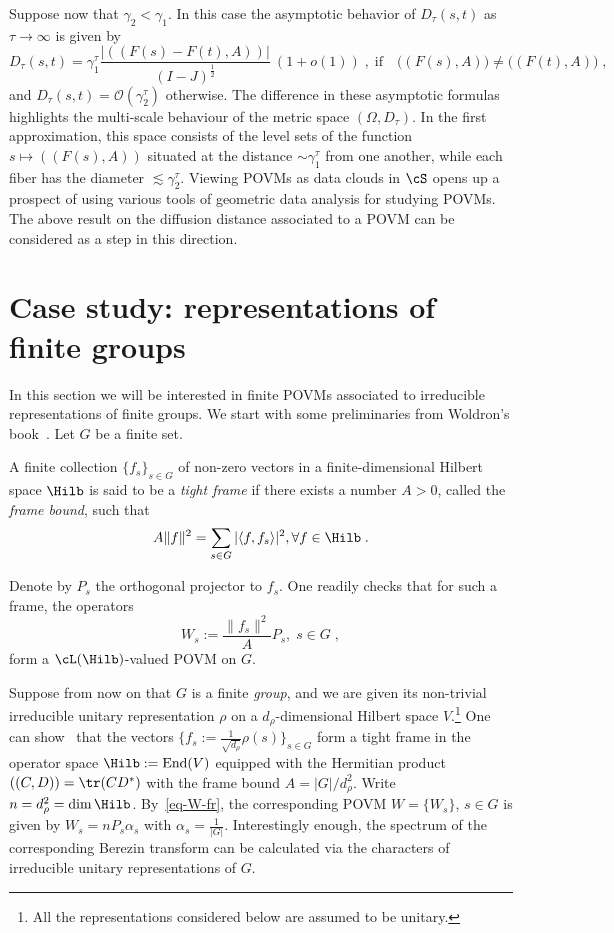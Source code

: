 Suppose now that $\gamma_2 < \gamma_1$. In this case the asymptotic behavior of $D_\tau(s,t)$ as $\tau \to \infty$ is given by
\begin{equation}
D_\tau(s,t)= \gamma_1^\tau\frac{|((F(s)-F(t),A))|}{(I-J)^{\frac{1}{2}}}\ (1+o(1))\;,\;\text{if}\quad \big((F(s),A))\neq ((F(t),A)\big)\;,
\end{equation}
and $D_\tau(s,t) = \mathcal{O}(\gamma_2^\tau)$ otherwise. The difference in these asymptotic formulas highlights the multi-scale behaviour of the metric space $(\Omega, D_\tau)$. In the first approximation, this space consists of the level sets of the function $s \mapsto ((F(s),A))$ situated at the distance $\sim \gamma_1^\tau$ from one another, while each fiber has the diameter $\lesssim \gamma_2^\tau$. Viewing POVMs as data clouds in $\cS$ opens up a prospect of using various tools of geometric data analysis for studying POVMs. The above result on the diffusion distance associated to a POVM can be considered as a step in this direction.

\section{Case study: representations of finite groups} \label{sec-groups}
In this section we will be interested in finite POVMs associated to irreducible representations of finite groups. We start with some preliminaries from Woldron's book~\cite{W}. Let $G$ be a finite set.

\begin{defi}\label{def-tight frame}
A finite collection $\{f_s\}_{s\in G}$ of non-zero vectors in a finite-dimensional Hilbert space $\Hilb$ is said to be a \emph{tight frame} if there exists a number $A > 0$, called the \emph{frame bound}, such that
\begin{equation}\label{Bessel}
A\| f \|^2 =\sum_{s\in G}|\langle f, f_s \rangle|^2, \forall f\in \Hilb\;.
\end{equation}
\end{defi}

Denote by $P_s$ the orthogonal projector to $f_s$. One readily checks that for such a frame, the operators
\begin{equation}\label{eq-W-fr}
W_s:= \frac{\|f_s\|^2}{A} P_s, \; s \in G\;,
\end{equation}
form a $\cL(\Hilb)$-valued POVM on $G$.

Suppose from now on that $G$ is a finite \emph{ group}, and we are given its non-trivial irreducible unitary representation $\rho$ on a $d_\rho$-dimensional Hilbert space $V$.\footnote{All the representations considered below are assumed to be unitary.} One can show~\cite{W} that the vectors $\{f_s:=\frac{1}{\sqrt{d_\rho}}\rho(s)\}_{s\in G}$ form a tight frame in the operator space $\Hilb:=\text{End}(V)$ equipped with the Hermitian product $((C,D)) = \tr (CD^*)$ with the frame bound $A={| G |}/{d_\rho ^2}$. Write $n=d_\rho^2 =\dim \Hilb$. By~\eqref{eq-W-fr}, the corresponding POVM $W= \{W_s\}$, $s \in G$ is given by $W_s = n P_s \alpha_s$ with $\alpha_s = \frac{1}{| G |}$. Interestingly enough, the spectrum of the corresponding Berezin transform can be calculated via the characters of irreducible unitary representations of $G$.

